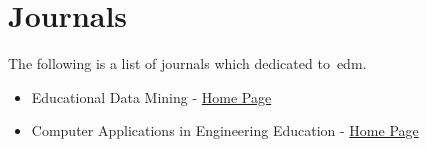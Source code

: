 \section{Journals}

The following is a list of journals which dedicated to~\gls{edm}.

\begin{itemize}
    \item Educational Data Mining -
        \href{http://www.educationaldatamining.org/proceedings}{Home Page}
    \item Computer Applications in Engineering Education -
        \href{http://onlinelibrary.wiley.com/journal/10.1002/(ISSN)1099-0542}{Home Page}
\end{itemize}
